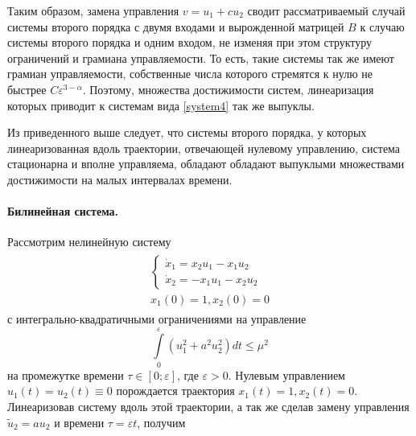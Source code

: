 \documentclass[../main.tex]{subfiles}
\begin{document}
Таким образом, замена управления $ v = u_1 + c u_2 $ сводит рассматриваемый случай системы второго порядка с двумя входами и вырожденной матрицей $ B $ к случаю системы второго порядка и одним входом, не изменяя при этом структуру ограничений и грамиана управляемости. То есть, такие системы так же имеют грамиан управляемости, собственные числа которого стремятся к нулю не быстрее $ C \varepsilon^{3-\alpha} $. Поэтому, множества достижимости систем, линеаризация которых приводит к системам вида \eqref{system4} так же выпуклы.

Из приведенного выше следует, что системы второго порядка, у которых линеаризованная вдоль траектории, отвечающей нулевому управлению, система стационарна и вполне управляема, обладают обладают выпуклыми множествами достижимости на малых интервалах времени.
\paragraph{Билинейная система.}
Рассмотрим нелинейную систему
\begin{gather}\label{system5}
	\begin{gathered}
		\left\{ {\begin{array}{*{20}{l}}
				{\dot{x}_1 =  x_2 u_1 - x_1 u_2}\\
				{\dot{x}_2 =  -x_1 u_1 - x_2 u_2}
		\end{array}} \right.
		\\
		x_1(0) = 1, x_2(0) = 0
	\end{gathered}
\end{gather}
с интегрально-квадратичными ограничениями на управление
\begin{equation*}
	\int \limits_0^{\varepsilon} \left( u_1^2 + a^2 u_2^2\right) dt \leq \mu^2
\end{equation*} 	
на промежутке времени $ \tau \in \left[0;\varepsilon \right] $, где $ \varepsilon > 0 $. Нулевым управлением $  u_1(t) = u_2(t) \equiv 0 $ порождается траектория $ x_1(t) = 1, x_2(t) = 0 $. Линеаризовав систему вдоль этой траектории, а так же сделав замену управления $ {\tilde u_2} = a u_2 $ и времени  $ \tau =\varepsilon t$, получим
\end{document}
